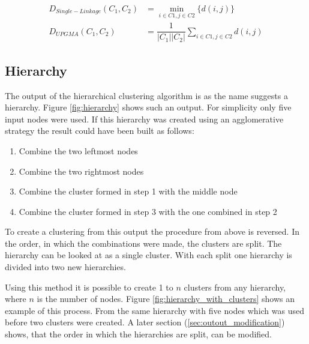 \begin{align}
\label{eq:df_single_linkage}
D_{Single-Linkage}(C_1, C_2) &= \min_{i\in{C1}, j\in{C2}}\{d(i, j)\} \\
\label{eq:df_upgma}
D_{UPGMA}(C_1, C_2) &= \dfrac{1}{|C_1||C_2|} \sum_{i\in{C1}, j\in{C2}}{d(i, j)}
\end{align}

\subsection{Hierarchy}
The output of the hierarchical clustering algorithm is as the name suggests a hierarchy. Figure \ref{fig:hierarchy} shows such an output. For simplicity only five input nodes were used. If this hierarchy was created using an agglomerative strategy the result could have been built as follows:

\begin{enumerate}
    \item Combine the two leftmost nodes
    \item Combine the two rightmost nodes
    \item Combine the cluster formed in step 1 with the middle node
    \item Combine the cluster formed in step 3 with the one combined in step 2
\end{enumerate}

To create a clustering from this output the procedure from above is reversed. In the order, in which the combinations were made, the clusters are split. The hierarchy can be looked at as a single cluster. With each split one hierarchy is divided into two new hierarchies.

Using this method it is possible to create 1 to $n$ clusters from any hierarchy, where $n$ is the number of nodes. Figure \ref{fig:hierarchy_with_clusters} shows an example of this process. From the same hierarchy with five nodes which was used before two clusters were created. A later section (\ref{sec:outout_modification}) shows, that the order in which the hierarchies are split, can be modified.

